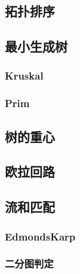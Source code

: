 \documentclass{article}
\begin{document}
\begin{multicols*}{2}
\subsection{拓扑排序}
\begin{small}

\end{small}

\subsection{最小生成树}
\subsubsection{Kruskal}
\begin{small}

\end{small}

\subsubsection{Prim}
\begin{small}

\end{small}

\subsection{树的重心}
\begin{small}

\end{small}

\subsection{欧拉回路}

\subsection{流和匹配}
\subsubsection{EdmondsKarp}
\begin{small}

\end{small}

\subsubsection{二分图判定}
\begin{small}

\end{small}


\end{multicols*}
\end{document}

